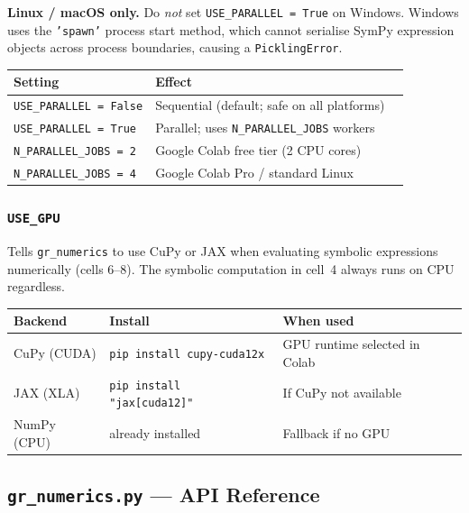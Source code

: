 \documentclass[11pt,a4paper]{article}
\newcommand{\code}[1]{\texttt{\small#1}}
\begin{document}
\begin{warnbox}
  \textbf{Linux / macOS only.}  Do \emph{not} set \code{USE\_PARALLEL = True}
  on Windows.  Windows uses the \code{'spawn'} process start method, which
  cannot serialise SymPy expression objects across process boundaries,
  causing a \code{PicklingError}.
\end{warnbox}

\begin{center}
\begin{tabular}{lll}
  \toprule
  Setting & Effect \\
  \midrule
  \code{USE\_PARALLEL = False} & Sequential (default; safe on all platforms) \\
  \code{USE\_PARALLEL = True} & Parallel; uses \code{N\_PARALLEL\_JOBS} workers \\
  \code{N\_PARALLEL\_JOBS = 2} & Google Colab free tier (2 CPU cores) \\
  \code{N\_PARALLEL\_JOBS = 4} & Google Colab Pro / standard Linux \\
  \bottomrule
\end{tabular}
\end{center}

\subsubsection{\code{USE\_GPU}}

Tells \code{gr\_numerics} to use CuPy or JAX when evaluating symbolic
expressions numerically (cells 6--8).  The symbolic computation in cell~4
always runs on CPU regardless.

\begin{center}
\begin{tabular}{lll}
  \toprule
  Backend & Install & When used \\
  \midrule
  CuPy (CUDA) & \code{pip install cupy-cuda12x} & GPU runtime selected in Colab \\
  JAX (XLA)  & \code{pip install "jax[cuda12]"} & If CuPy not available \\
  NumPy (CPU) & already installed & Fallback if no GPU \\
  \bottomrule
\end{tabular}
\end{center}

\subsection{\code{gr\_numerics.py} — API Reference}
\end{document}
